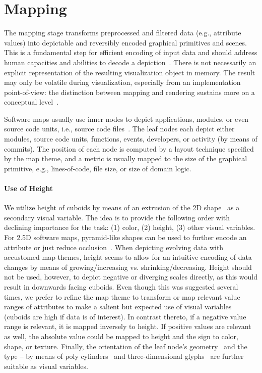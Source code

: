 \documentclass[sigconf]{acmart}
\def\eg{e.g., }
\def\ie{i.e., }
\begin{document}
\section{Mapping}
\label{VINCI:Sec:Mapping}
\par
The mapping stage transforms preprocessed and filtered data (\eg attribute values) into depictable and reversibly encoded graphical primitives and scenes.
This is a fundamental step for efficient encoding of input data and should address human capacities and abilities to decode a depiction~\cite{ware2012-information}.
There is not necessarily an explicit representation of the resulting visualization object in memory.
The result may only be volatile during visualization, especially from an implementation point-of-view: the distinction between mapping and rendering sustains more on a conceptual level~\cite{trapp2013-gputreemaps,scheibel2016-avcs}. 
\par
Software maps usually use inner nodes to depict applications, modules, or even source code units, \ie source code files~\cite{bohnet2011-codemonitoring}.
The leaf nodes each depict either modules, source code units, functions, events, developers, or activity (by means of commits).
The position of each node is computed by a layout technique specified by the map theme, and a metric is usually mapped to the size of the graphical primitive, \eg lines-of-code, file size, or size of domain logic.
\paragraph{Use of Height}
We utilize height of cuboids by means of an extrusion of the 2D shape~\cite{bladh2004-threedimensions,choi2011-stratatreemaps} as a secondary visual variable.
The idea is to provide the following order with declining importance for the task: (1) color, (2) height, (3) other visual variables.
For 2.5D software maps, pyramid-like shapes can be used to further encode an attribute or just reduce occlusion~\cite{turo1992-improve}.
When depicting evolving data with accustomed map themes, height seems to allow for an intuitive encoding of data changes by means of growing/increasing vs. shrinking/decreasing.
Height should not be used, however, to depict negative or diverging scales directly, as this would result in downwards facing cuboids.
Even though this was suggested several times, we prefer to refine the map theme to transform or map relevant value ranges of attributes to make a salient but expected use of visual variables (cuboids are high if data is of interest).
In contrast thereto, if a negative value range is relevant, it is mapped inversely to height. If positive values are relevant as well, the absolute value could be mapped to height and the sign to color, shape, or texture.
Finally, the orientation of the leaf node's geometry~\cite{langelier2005-qualityanalysis} and the type -- by means of poly cylinders~\cite{marcus2003-softvis} and three-dimensional glyphs~\cite{boccuzzo2007-cognitive} are further suitable as visual variables.
\end{document}
